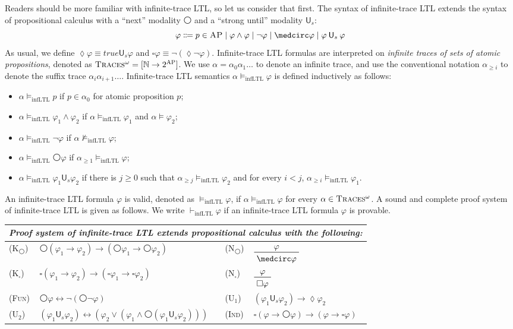 \documentclass[letter,12pt]{article}
\newcommand{\imp}{\to}
\newcommand{\dimp}{\leftrightarrow}
\newcommand{\pset}[1]{2^{#1}}
\newcommand{\infLTL}{\mathrm{infLTL}}
\newcommand{\prule}[1]{\textsc{(#1)}}
\newcommand{\AP}{\textsc{AP}}
\newcommand{\true}{\mathit{true}}
\newcommand{\wnext}{{\medcirc}}
\newcommand{\always}{{\square}}
\newcommand{\eventually}{{\lozenge}}
\newcommand{\Us}{\mathbin{\mathsf{U}_s}}
\newcommand{\infTraces}{\textsc{Traces$^\omega$}\xspace}
\newcommand{\NN}{\mathbb{N}}
\begin{document}
Readers should be more familiar with infinite-trace LTL, 
so let us consider that first.
The syntax of infinite-trace LTL 
extends the syntax of propositional calculus
with a ``next'' modality $\wnext$ 
and a ``strong until'' modality $\mathsf{U}_s$:
$$
\varphi \Coloneqq p \in \AP
\mid \varphi \wedge \varphi
\mid \neg \varphi
\mid \wnext \varphi
\mid \varphi \Us \varphi
$$
As usual,
we define $\eventually \varphi \equiv \true \Us \varphi$
and $\always \varphi \equiv \neg (\eventually \neg \varphi)$.
Infinite-trace LTL formulas are interpreted on 
\emph{infinite traces of sets of atomic propositions},
denoted as $\infTraces = [ \NN \to \pset{\AP}]$.
We use $\alpha = \alpha_0\alpha_1\dots$
to denote an infinite trace,
and use the conventional notation
$\alpha_{\ge i}$ to denote the suffix trace
$\alpha_i \alpha_{i+1} \dots$.
Infinite-trace LTL semantics $\alpha \vDash_\infLTL \varphi$ is defined 
inductively as follows:
\begin{itemize}
\item $\alpha \vDash_\infLTL p$ if $p \in \alpha_0$ for atomic proposition $p$;
\item $\alpha \vDash_\infLTL \varphi_1 \wedge \varphi_2$
if $\alpha \vDash_\infLTL \varphi_1$ and $\alpha \vDash \varphi_2$;
\item $\alpha \vDash_\infLTL \neg \varphi$
if $\alpha \not\vDash_\infLTL \varphi$;
\item $\alpha  \vDash_\infLTL \wnext \varphi$
if $\alpha_{\ge 1} \vDash_\infLTL \varphi$;
\item $\alpha \vDash_\infLTL \varphi_1 \Us \varphi_2$
if there is $j \ge 0$ such that
$\alpha_{\ge j} \vDash_\infLTL \varphi_2$ and for every $i < j$,
$\alpha_{\ge i} \vDash_\infLTL \varphi_1$.
\end{itemize}
An infinite-trace LTL formula $\varphi$ is valid,
denoted as $\vDash_\infLTL \varphi$,
if $\alpha \vDash_\infLTL \varphi$ 
for every $\alpha \in \infTraces$.
A sound and complete proof system of infinite-trace LTL
is given as follows.
We write $\vdash_\infLTL \varphi$
if an infinite-trace LTL formula $\varphi$ is provable.
\begin{center}
\begin{tabular}{lm{6cm}lm{3.8cm}}
\multicolumn{4}{l}{
\em
Proof system of infinite-trace LTL extends propositional calculus with the following:
}
\\\hline
\prule{K$_\wnext$}
&
$\wnext (\varphi_1 \imp \varphi_2) \imp (\wnext \varphi_1 \imp \wnext 
\varphi_2)$
&
\prule{N$_\wnext$}
&
$\prftree{\varphi}{\wnext \varphi}$
\\
\prule{K$_\always$}
&
$\always (\varphi_1 \imp \varphi_2) \imp (\always \varphi_1 \imp \always 
\varphi_2)$
&
\prule{N$_\always$}
&
$\prftree{\varphi}{\always \varphi}$
\\
\prule{Fun}
&
$\wnext \varphi \dimp \neg (\wnext \neg \varphi)$
&
\prule{U$_1$}
&
$(\varphi_1 \Us \varphi_2) \imp \eventually \varphi_2$
\\
\prule{U$_2$}
&
$(\varphi_1 \Us \varphi_2) 
\dimp 
(\varphi_2 \vee (\varphi_1 \wedge \wnext (\varphi_1 \Us \varphi_2)))$
&
\prule{Ind}
&
$\always(\varphi \imp \wnext \varphi) \imp (\varphi \imp \always \varphi)$
\end{tabular}
\end{center}
\end{document}
